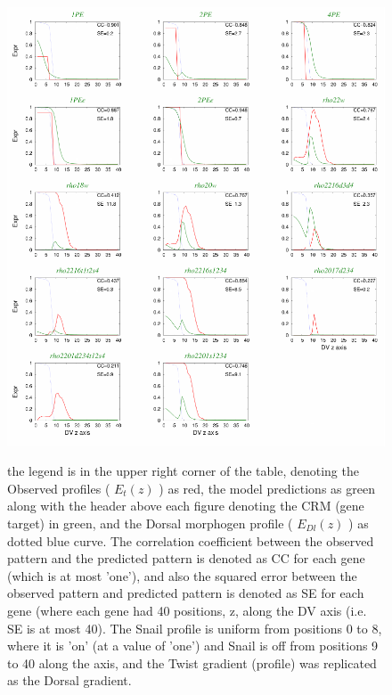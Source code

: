 \begin{figure}
  \includegraphics[width=1\textwidth]{DIb.pdf}\\
  \caption{the legend is in the upper right corner of the table, denoting the Observed profiles ( $E_t(z)$ ) as red, the model predictions as green along with the header above each figure denoting the CRM (gene target) in green, and the Dorsal morphogen profile  ( $E_{Dl}(z)$ ) as dotted blue curve.  The correlation coefficient between the observed pattern and the predicted pattern is denoted as CC for each gene (which is at most 'one'), and also the squared error between the observed pattern and predicted pattern is denoted as SE for each gene (where each gene had 40 positions, z, along the DV axis (i.e. SE is at most 40).  The Snail profile is uniform from positions 0 to 8, where it is 'on' (at a value of 'one') and Snail is off from positions 9 to 40 along the axis, and the Twist gradient (profile) was replicated as the Dorsal gradient. }\label{roughfit}
\end{figure}

\newpage

